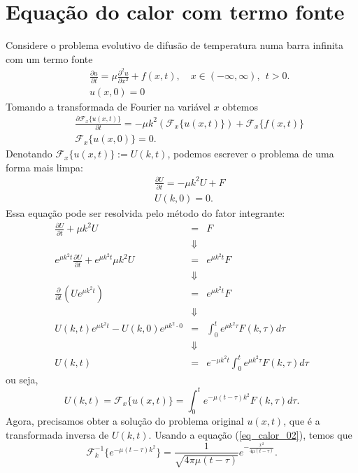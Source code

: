\section{Equação do calor com termo fonte}
Considere o problema evolutivo de difusão de temperatura numa barra infinita com um termo fonte
\begin{eqnarray*}
&&\frac{\partial u}{\partial t}=\mu \frac{\partial^2u}{\partial
x^2}+f(x,t),\quad x\in(-\infty,\infty),\ \ t>0.\\
&&u(x,0)=0
\end{eqnarray*}
Tomando a transformada de Fourier na variável $x$ obtemos
\begin{eqnarray*}
&&\frac{\partial \mathcal{F}_x\{u(x,t)\}}{\partial t}=-\mu k^2 (\mathcal{F}_x \{u(x,t)\})+\mathcal{F}_x \{f(x,t)\} \\
&&\mathcal{F}_x\{u(x,0)\}=0.
\end{eqnarray*}
Denotando $\mathcal{F}_x\{u(x,t)\}:=U(k,t)$, podemos escrever o problema de uma forma mais limpa:
\begin{eqnarray*}
&&\frac{\partial U}{\partial t}=-\mu k^2 U+F \\
&&U(k,0)=0.
\end{eqnarray*}
Essa equação pode ser resolvida pelo método do fator integrante:
\begin{eqnarray*}
\frac{\partial U}{\partial t}+\mu k^2 U&=&F \\
&\Downarrow&\\
e^{\mu k^2t}\frac{\partial U}{\partial t}+e^{\mu k^2t}\mu k^2 U&=&e^{\mu k^2t}F \\
&\Downarrow&\\
\frac{\partial }{\partial t}\left(Ue^{\mu k^2t}\right)&=&e^{\mu k^2t}F \\
&\Downarrow&\\
 U(k,t)e^{\mu k^2 t}-U(k,0)e^{\mu k^2 \cdot 0}&=&\int_0^t e^{\mu k^2\tau}F(k,\tau) d\tau\\
&\Downarrow&\\
 U(k,t)&=&e^{-\mu k^2 t}\int_0^t e^{\mu k^2\tau}F(k,\tau) d\tau
\end{eqnarray*}
ou seja,
\begin{equation*}
 U(k,t)=\mathcal{F}_x\{u(x,t)\}=\int_0^t
e^{-\mu (t-\tau)k^2}F(k,\tau)d\tau.
\end{equation*}
Agora, precisamos obter a solução do problema original $u(x,t)$, que é a transformada inversa de $U(k,t)$. Usando a equação (\ref{eq_calor_02}), temos que
\begin{equation*}
\mathcal{F}^{-1}_k\{e^{-\mu (t-\tau) k^2}\}=\frac{1}{\sqrt{4\pi\mu (t-\tau)}} e^{-\frac{x^2}{4\mu (t-\tau)}}.
\end{equation*}
